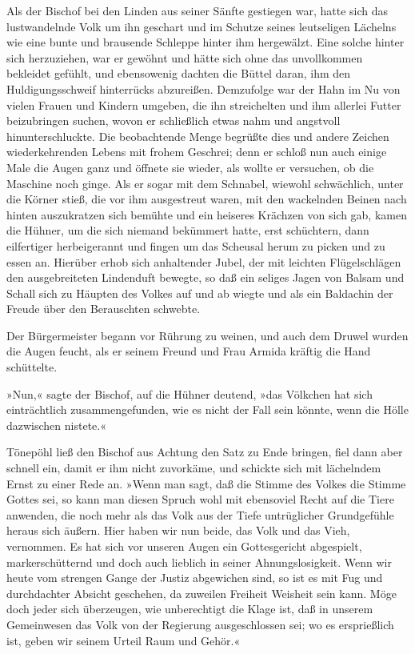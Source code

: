 Als der Bischof bei den Linden aus seiner Sänfte gestiegen war,
hatte sich das lustwandelnde Volk um ihn\pagenum{[47]} geschart
und im Schutze seines leutseligen Lächelns wie eine bunte und
brausende Schleppe hinter ihm hergewälzt. Eine solche hinter sich
herzuziehen, war er gewöhnt und hätte sich ohne das unvollkommen
bekleidet gefühlt, und ebensowenig dachten die Büttel daran, ihm
den Huldigungsschweif hinterrücks abzureißen. Demzufolge war der
Hahn im Nu von vielen Frauen und Kindern umgeben, die ihn
streichelten und ihm allerlei Futter beizubringen suchen, wovon er
schließlich etwas nahm und angstvoll hinunterschluckte. Die
beobachtende Menge begrüßte dies und andere Zeichen wiederkehrenden
Lebens mit frohem Geschrei; denn er schloß nun auch einige Male die
Augen ganz und öffnete sie wieder, als wollte er versuchen, ob die
Maschine noch ginge. Als er sogar mit dem Schnabel, wiewohl
schwächlich, unter die Körner stieß, die vor ihm ausgestreut waren,
mit den wackelnden Beinen nach hinten auszukratzen sich bemühte und
ein heiseres Krächzen von sich gab, kamen die Hühner, um die sich
niemand bekümmert hatte, erst schüchtern, dann eilfertiger
herbeigerannt und fingen um das Scheusal herum zu picken und zu
essen an. Hierüber erhob sich anhaltender Jubel, der mit leichten
Flügelschlägen den ausgebreiteten Lindenduft bewegte, so daß ein
seliges Jagen von Balsam und Schall sich zu Häupten des Volkes auf
und ab wiegte und als ein Baldachin der Freude über den Berauschten
schwebte.

Der Bürgermeister begann vor Rührung zu weinen, und auch dem Druwel
wurden die Augen feucht, als er seinem Freund und Frau Armida
kräftig die Hand schüttelte.

»Nun,« sagte der Bischof, auf die Hühner deutend, »das Völkchen hat
sich einträchtlich zusammengefunden, wie es nicht der Fall sein
könnte, wenn die Hölle dazwischen nistete.«

\pagenum{[48]}Tönepöhl ließ den Bischof aus Achtung den Satz zu
Ende bringen, fiel dann aber schnell ein, damit er ihm nicht
zuvorkäme, und schickte sich mit lächelndem Ernst zu einer Rede an.
»Wenn man sagt, daß die Stimme des Volkes die Stimme Gottes sei, so
kann man diesen Spruch wohl mit ebensoviel Recht auf die Tiere
anwenden, die noch mehr als das Volk aus der Tiefe untrüglicher
Grundgefühle heraus sich äußern. Hier haben wir nun beide, das Volk
und das Vieh, vernommen. Es hat sich vor unseren Augen ein
Gottesgericht abgespielt, markerschütternd und doch auch lieblich
in seiner Ahnungslosigkeit. Wenn wir heute vom strengen Gange der
Justiz abgewichen sind, so ist es mit Fug und durchdachter Absicht
geschehen, da zuweilen Freiheit Weisheit sein kann. Möge doch jeder
sich überzeugen, wie unberechtigt die Klage ist, daß in unserem
Gemeinwesen das Volk von der Regierung ausgeschlossen sei; wo es
ersprießlich ist, geben wir seinem Urteil Raum und Gehör.«

